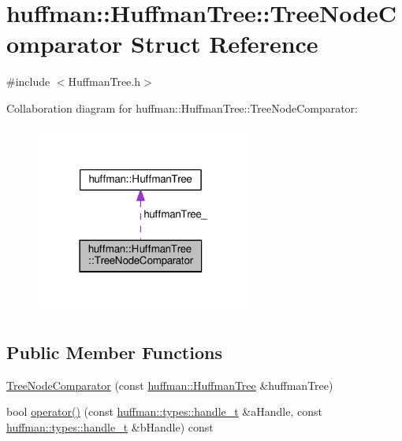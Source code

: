 \hypertarget{structhuffman_1_1HuffmanTree_1_1TreeNodeComparator}{}\section{huffman\+:\+:Huffman\+Tree\+:\+:Tree\+Node\+Comparator Struct Reference}
\label{structhuffman_1_1HuffmanTree_1_1TreeNodeComparator}


{\ttfamily \#include $<$Huffman\+Tree.\+h$>$}



Collaboration diagram for huffman\+:\+:Huffman\+Tree\+:\+:Tree\+Node\+Comparator\+:
\nopagebreak
\begin{figure}[H]
\begin{center}
\leavevmode
\includegraphics[width=202pt]{structhuffman_1_1HuffmanTree_1_1TreeNodeComparator__coll__graph}
\end{center}
\end{figure}
\subsection*{Public Member Functions}
\begin{DoxyCompactItemize}
\item 
\hyperlink{structhuffman_1_1HuffmanTree_1_1TreeNodeComparator_af7a98f1e7a01c6a239c13fc980fb0de7}{Tree\+Node\+Comparator} (const \hyperlink{classhuffman_1_1HuffmanTree}{huffman\+::\+Huffman\+Tree} \&huffman\+Tree)
\item 
bool \hyperlink{structhuffman_1_1HuffmanTree_1_1TreeNodeComparator_a24a7c95bd79dc7e189c2bed39ebece01}{operator()} (const \hyperlink{namespacehuffman_1_1types_a41dc8ca07e19043152b0a5c8b5fec90b}{huffman\+::types\+::handle\+\_\+t} \&a\+Handle, const \hyperlink{namespacehuffman_1_1types_a41dc8ca07e19043152b0a5c8b5fec90b}{huffman\+::types\+::handle\+\_\+t} \&b\+Handle) const 
\end{DoxyCompactItemize}
